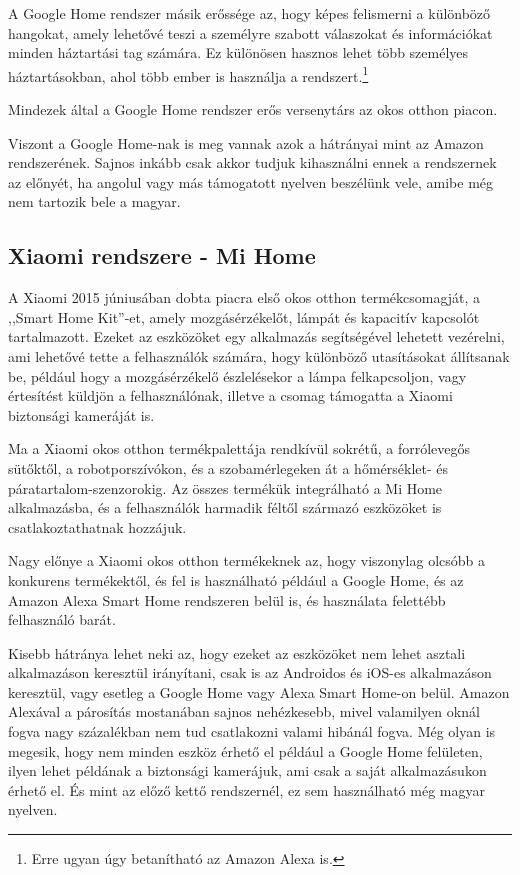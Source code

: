 \documentclass[
]{thesis-ekf}
\theoremstyle{definition}
\theoremstyle{remark}
\begin{document}
	A Google Home rendszer másik erőssége az, hogy képes felismerni a különböző hangokat, amely lehetővé teszi a személyre szabott válaszokat és információkat minden háztartási tag számára. Ez különösen hasznos lehet több személyes háztartásokban, ahol több ember is használja a rendszert.\footnote{Erre ugyan úgy betanítható az Amazon Alexa is.}
	
 	Mindezek által a Google Home rendszer erős versenytárs az okos otthon piacon.
	
	Viszont a Google Home-nak is meg vannak azok a hátrányai mint az Amazon rendszerének. Sajnos inkább csak akkor tudjuk kihasználni ennek a rendszernek az előnyét, ha angolul vagy más támogatott nyelven beszélünk vele, amibe még nem tartozik bele a magyar.
	
	\subsection{Xiaomi rendszere - Mi Home}
	A Xiaomi 2015 júniusában dobta piacra első okos otthon termékcsomagját, a ,,Smart Home Kit''-et, amely mozgásérzékelőt, lámpát és kapacitív kapcsolót tartalmazott. Ezeket az eszközöket egy alkalmazás segítségével lehetett vezérelni, ami lehetővé tette a felhasználók számára, hogy különböző utasításokat állítsanak be, például hogy a mozgásérzékelő észlelésekor a lámpa felkapcsoljon, vagy értesítést küldjön a felhasználónak, illetve a csomag támogatta a Xiaomi biztonsági kameráját is. \cite{xiaomi-home}
	
	Ma a Xiaomi okos otthon termékpalettája rendkívül sokrétű, a forrólevegős sütőktől, a robotporszívókon, és a szobamérlegeken át a hőmérséklet- és páratartalom-szenzorokig. Az összes termékük integrálható a Mi Home alkalmazásba, és a felhasználók harmadik féltől származó eszközöket is csatlakoztathatnak hozzájuk.
	
	Nagy előnye a Xiaomi okos otthon termékeknek az, hogy viszonylag olcsóbb a konkurens termékektől, és fel is használható például a Google Home, és az Amazon Alexa Smart Home rendszeren belül is, és használata felettébb felhasználó barát.
	
	Kisebb hátránya lehet neki az, hogy ezeket az eszközöket nem lehet asztali alkalmazáson keresztül irányítani, csak is az Androidos és iOS-es alkalmazáson keresztül, vagy esetleg a Google Home vagy Alexa Smart Home-on belül. Amazon Alexával a párosítás mostanában sajnos nehézkesebb, mivel valamilyen oknál fogva nagy százalékban nem tud csatlakozni valami hibánál fogva. Még olyan is megesik, hogy nem minden eszköz érhető el például a Google Home felületen, ilyen lehet példának a biztonsági kamerájuk, ami csak a saját alkalmazásukon érhető el. És mint az előző kettő rendszernél, ez sem használható még magyar nyelven.
	
\end{document}
